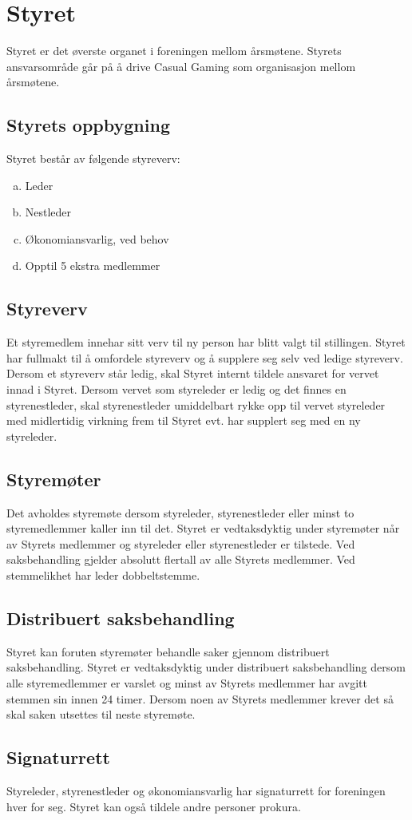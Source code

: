 \chapter{Styret}
Styret er det øverste organet i foreningen mellom årsmøtene. Styrets ansvarsområde går på å drive Casual Gaming som organisasjon mellom årsmøtene.

\section{Styrets oppbygning}
Styret består av følgende styreverv:
\begin{enumerate}[a.]
    \item Leder
    \item Nestleder
    \item Økonomiansvarlig, ved behov
    \item Opptil 5 ekstra medlemmer
\end{enumerate}

\section{Styreverv}
Et styremedlem innehar sitt verv til ny person har blitt valgt til stillingen. Styret har fullmakt til å omfordele styreverv og å supplere seg selv ved ledige styreverv. Dersom et styreverv står ledig, skal Styret internt tildele ansvaret for vervet innad i Styret. Dersom vervet som styreleder er ledig og det finnes en styrenestleder, skal styrenestleder umiddelbart rykke opp til vervet styreleder med midlertidig virkning frem til Styret evt. har supplert seg med en ny styreleder.

\section{Styremøter}
Det avholdes styremøte dersom styreleder, styrenestleder eller minst to styremedlemmer kaller inn til det. Styret er vedtaksdyktig under styremøter når  av Styrets medlemmer og styreleder eller styrenestleder er tilstede. Ved saksbehandling gjelder absolutt flertall av alle Styrets medlemmer. Ved stemmelikhet har leder dobbeltstemme.

\section{Distribuert saksbehandling}
Styret kan foruten styremøter behandle saker gjennom distribuert saksbehandling. Styret er vedtaksdyktig under distribuert saksbehandling dersom alle styremedlemmer er varslet og minst  av Styrets medlemmer har avgitt stemmen sin innen 24 timer. Dersom noen av Styrets medlemmer krever det så skal saken utsettes til neste styremøte.

\section{Signaturrett}
Styreleder, styrenestleder og økonomiansvarlig har signaturrett for foreningen hver for seg. Styret kan også tildele andre personer prokura.
